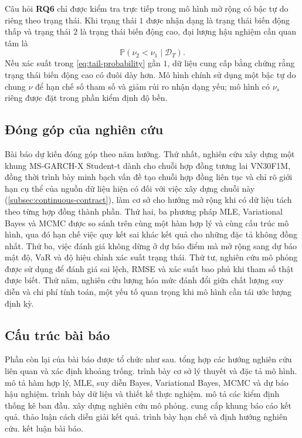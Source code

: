 \documentclass[12pt,a4paper]{article}
\numberwithin{equation}{section}
\newcommand{\Data}{\mathcal{D}}
\newcommand{\Prob}{\mathbb{P}}
\newcommand{\RQ}[1]{\textbf{RQ#1}}
\begin{document}
Câu hỏi \RQ{6} chỉ được kiểm tra trực tiếp trong mô hình mở rộng có bậc tự do riêng theo trạng thái. Khi trạng thái $1$ được nhận dạng là trạng thái biến động thấp và trạng thái $2$ là trạng thái biến động cao, đại lượng hậu nghiệm cần quan tâm là
\begin{equation}
  \Prob\!\left(\nu_{2}<\nu_{1}\mid\Data_T\right).
  \label{eq:tail-probability}
\end{equation}
Nếu xác suất trong \cref{eq:tail-probability} gần $1$, dữ liệu cung cấp bằng chứng rằng trạng thái biến động cao có đuôi dày hơn. Mô hình chính sử dụng một bậc tự do chung $\nu$ để hạn chế số tham số và giảm rủi ro nhận dạng yếu; mô hình có $\nu_s$ riêng được đặt trong phần kiểm định độ bền.

\subsection{Đóng góp của nghiên cứu}\label{subsec:dong-gop}

Bài báo dự kiến đóng góp theo năm hướng. Thứ nhất, nghiên cứu xây dựng một khung MS-GARCH-X Student-t dành cho chuỗi hợp đồng tương lai VN30F1M, đồng thời trình bày minh bạch vấn đề tạo chuỗi hợp đồng liên tục và chỉ rõ giới hạn cụ thể của nguồn dữ liệu hiện có đối với việc xây dựng chuỗi này (\cref{subsec:continuous-contract}), làm cơ sở cho hướng mở rộng khi có dữ liệu tách theo từng hợp đồng thành phần. Thứ hai, ba phương pháp MLE, Variational Bayes và MCMC được so sánh trên cùng một hàm hợp lý và cùng cấu trúc mô hình, qua đó hạn chế việc quy kết sai khác kết quả cho những đặc tả không đồng nhất. Thứ ba, việc đánh giá không dừng ở dự báo điểm mà mở rộng sang dự báo mật độ, VaR và độ hiệu chỉnh xác suất trạng thái. Thứ tư, nghiên cứu mô phỏng được sử dụng để đánh giá sai lệch, RMSE và xác suất bao phủ khi tham số thật được biết. Thứ năm, nghiên cứu lượng hóa mức đánh đổi giữa chất lượng suy diễn và chi phí tính toán, một yếu tố quan trọng khi mô hình cần tái ước lượng định kỳ.

\subsection{Cấu trúc bài báo}\label{subsec:cau-truc}

Phần còn lại của bài báo được tổ chức như sau.  tổng hợp các hướng nghiên cứu liên quan và xác định khoảng trống.  trình bày cơ sở lý thuyết và đặc tả mô hình.  mô tả hàm hợp lý, MLE, suy diễn Bayes, Variational Bayes, MCMC và dự báo hậu nghiệm.  trình bày dữ liệu và thiết kế thực nghiệm.  mô tả các kiểm định thống kê ban đầu.  xây dựng nghiên cứu mô phỏng.  cung cấp khung báo cáo kết quả.  thảo luận cách diễn giải kết quả.  trình bày hạn chế và định hướng nghiên cứu.  kết luận bài báo.
\end{document}

